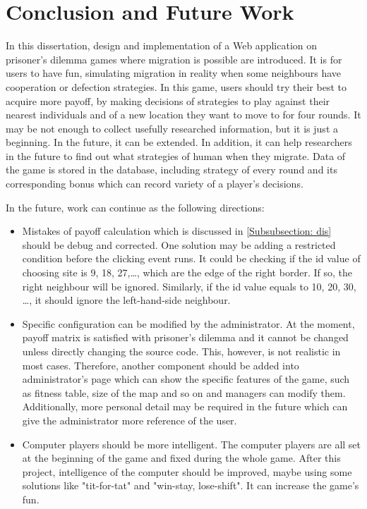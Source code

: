

\chapter{Conclusion and Future Work} \label{Chapter: Conclusion}
In this dissertation, design and implementation of a Web application on prisoner's dilemma games where migration is possible are introduced. It is for users to have fun, simulating migration in reality when some neighbours have cooperation or defection strategies. In this game, users should try their best to acquire more payoff, by making decisions of strategies to play against their nearest individuals and of a new location they want to move to for four rounds. It may be not enough to collect usefully researched information, but it is just a beginning. In the future, it can be extended. In addition, it can help researchers in the future to find out what strategies of human when they migrate. Data of the game is stored in the database, including strategy of every round and its corresponding bonus which can record variety of a player's decisions.

In the future, work can continue as the following directions:
\begin{itemize}
\item Mistakes of payoff calculation which is discussed in \cref{Subsubsection: dis} should be debug and corrected. One solution may be adding a restricted condition before the clicking event runs. It could be checking if the id value of choosing site is 9, 18, 27,\dots , which are the edge of the right border. If so, the right neighbour will be ignored. Similarly, if the id value equals to 10, 20, 30, \dots , it should ignore the left-hand-side neighbour.
\item Specific configuration can be modified by the administrator. At the moment, payoff matrix is satisfied with prisoner's dilemma and it cannot be changed unless directly changing the source code. This, however, is not realistic in most cases. Therefore, another component should be added into administrator's page which can show the specific features of the game, such as fitness table, size of the map and so on and managers can modify them. Additionally, more personal detail may be required in the future which can give the administrator more reference of the user.
\item Computer players should be more intelligent. The computer players are all set at the beginning of the game and fixed during the whole game. After this project, intelligence of the computer should be improved, maybe using some solutions like "tit-for-tat" and "win-stay, lose-shift". It can increase the game's fun.
\end{itemize}










